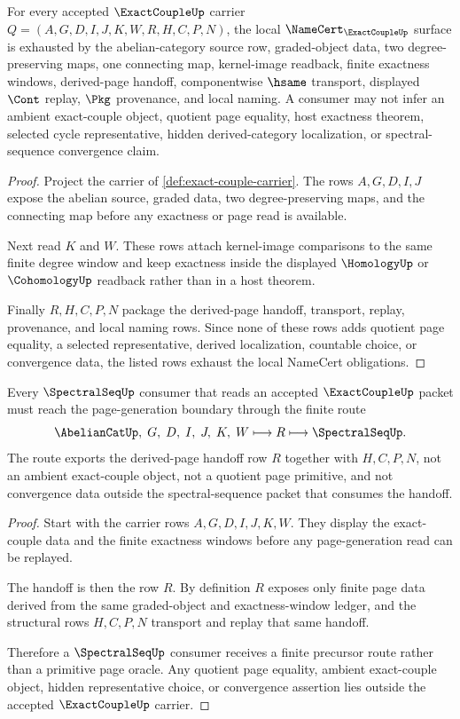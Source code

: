 \begin{theorem}
\label{thm:exact-couple-namecert-obligations}
For every accepted $\ExactCoupleUp$ carrier $Q=(A,G,D,I,J,K,W,R,H,C,P,N)$, the local $\NameCert_{\ExactCoupleUp}$ surface is exhausted by the abelian-category source row, graded-object data, two degree-preserving maps, one connecting map, kernel-image readback, finite exactness windows, derived-page handoff, componentwise $\hsame$ transport, displayed $\Cont$ replay, $\Pkg$ provenance, and local naming. A consumer may not infer an ambient exact-couple object, quotient page equality, host exactness theorem, selected cycle representative, hidden derived-category localization, or spectral-sequence convergence claim.
\end{theorem}
\begin{proof}
Project the carrier of \autoref{def:exact-couple-carrier}. The rows $A,G,D,I,J$ expose the abelian source, graded data, two degree-preserving maps, and the connecting map before any exactness or page read is available.

Next read $K$ and $W$. These rows attach kernel-image comparisons to the same finite degree window and keep exactness inside the displayed $\HomologyUp$ or $\CohomologyUp$ readback rather than in a host theorem.

Finally $R,H,C,P,N$ package the derived-page handoff, transport, replay, provenance, and local naming rows. Since none of these rows adds quotient page equality, a selected representative, derived localization, countable choice, or convergence data, the listed rows exhaust the local NameCert obligations.
\end{proof}

\begin{theorem}
\label{thm:exact-couple-spectral-sequence-handoff}
Every $\SpectralSeqUp$ consumer that reads an accepted $\ExactCoupleUp$ packet must reach the page-generation boundary through the finite route
$$
\AbelianCatUp,\;G,\;D,\;I,\;J,\;K,\;W \longmapsto R \longmapsto \SpectralSeqUp .
$$
The route exports the derived-page handoff row $R$ together with $H,C,P,N$, not an ambient exact-couple object, not a quotient page primitive, and not convergence data outside the spectral-sequence packet that consumes the handoff.
\end{theorem}
\begin{proof}
Start with the carrier rows $A,G,D,I,J,K,W$. They display the exact-couple data and the finite exactness windows before any page-generation read can be replayed.

The handoff is then the row $R$. By definition $R$ exposes only finite page data derived from the same graded-object and exactness-window ledger, and the structural rows $H,C,P,N$ transport and replay that same handoff.

Therefore a $\SpectralSeqUp$ consumer receives a finite precursor route rather than a primitive page oracle. Any quotient page equality, ambient exact-couple object, hidden representative choice, or convergence assertion lies outside the accepted $\ExactCoupleUp$ carrier.
\end{proof}

